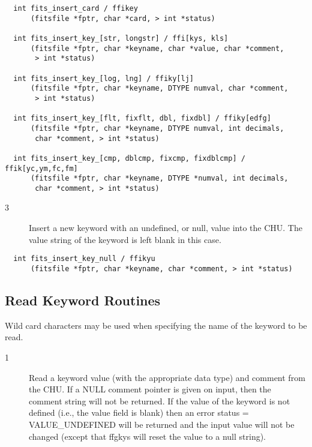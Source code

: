 \documentclass[11pt]{book}
\begin{document}
\begin{verbatim}
  int fits_insert_card / ffikey
      (fitsfile *fptr, char *card, > int *status)

  int fits_insert_key_[str, longstr] / ffi[kys, kls]
      (fitsfile *fptr, char *keyname, char *value, char *comment,
       > int *status)

  int fits_insert_key_[log, lng] / ffiky[lj]
      (fitsfile *fptr, char *keyname, DTYPE numval, char *comment,
       > int *status)

  int fits_insert_key_[flt, fixflt, dbl, fixdbl] / ffiky[edfg]
      (fitsfile *fptr, char *keyname, DTYPE numval, int decimals,
       char *comment, > int *status)

  int fits_insert_key_[cmp, dblcmp, fixcmp, fixdblcmp] / ffik[yc,ym,fc,fm]
      (fitsfile *fptr, char *keyname, DTYPE *numval, int decimals,
       char *comment, > int *status)
\end{verbatim}

\begin{description}
\item[3 ] Insert a new keyword with an undefined, or null, value into the CHU.
   The value string of the keyword is left blank in this case. \label{ffikyu}
\end{description}

\begin{verbatim}
  int fits_insert_key_null / ffikyu
      (fitsfile *fptr, char *keyname, char *comment, > int *status)
\end{verbatim}


\subsection{Read Keyword Routines}

Wild card characters may be used when specifying the name of the
keyword to be read.


\begin{description}
\item[1 ] Read a keyword value (with the appropriate data type) and comment from
    the CHU.  If a NULL comment pointer is given on input, then the comment
    string will not be returned.  If the value of the keyword is not defined
    (i.e., the value field is blank) then an error status = VALUE\_UNDEFINED
    will be returned and the input value will not be changed (except that
    ffgkys will reset the value to a null string).
  \label{ffgkyx} \label{ffgkls}
\end{description}
\end{document}
